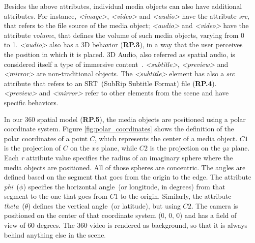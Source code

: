 Besides the above attributes, individual media objects can also have
additional attributes.
For instance, \emph{<image>}, \emph{<video>} and \emph{<audio>} have the
attribute \emph{src}, that refers to the file source of the media object;
 \emph{<audio>} and \emph{<video>} have the attribute \emph{volume}, that
defines the volume of such media objects, varying from 0 to 1.
\textit{<audio>} also has a 3D behavior (\textbf{RP.3}), in a way that the
user perceives the position in which it is placed.
3D Audio, also referred as spatial audio, is considered itself a type of immersive content~\cite{hughes_disruptive_2019}.
\emph{<subtitle>}, \emph{<preview>} and \emph{<mirror>} are non-traditional
objects.
The \emph{<subtitle>} element has also a \emph{src} attribute that refers to an
SRT~(SubRip Subtitle Format) file (\textbf{RP.4}).
\emph{<preview>} and \emph{<mirror>} refer to other elements from the scene
and have specific behaviors.

In our 360 spatial model (\textbf{RP.5}), the media objects are positioned
using a polar coordinate system.
Figure \ref{fig:polar_coordinates} shows the definition of the polar
coordinates of a point $C$, which represents the center of a media object.
$C1$ is the projection of $C$ on the $xz$ plane, while $C2$ is the projection
on the $yz$ plane.
Each \emph{r} attribute value specifies the radius of an imaginary sphere
where the media objects are positioned.
All of those spheres are concentric.
The angles are defined based on the segment that goes from the origin to the
edge.
The attribute \emph{phi}~($\phi$) specifies the horizontal angle~(or longitude, in degrees)
from that segment to the one that goes from $C1$ to the origin.
Similarly, the attribute \emph{theta}~($\theta$) defines the vertical angle~(or latitude), but using $C2$. 
The camera is positioned on the center of that coordinate system ($0$, $0$, $0$) and has a field of view of 60 degrees.
The 360 video is rendered as background, so that it is always behind anything else in the scene.


